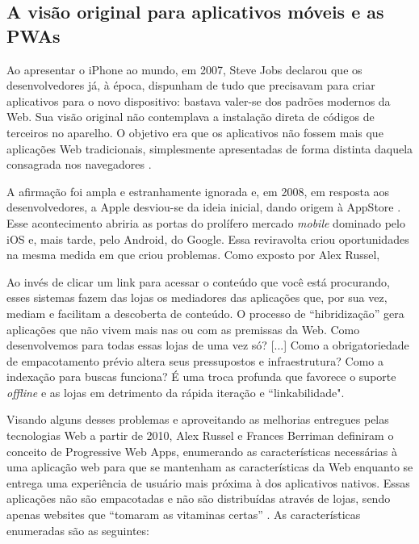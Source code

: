 \documentclass[
	article,			%
	11pt,				%
	oneside,			%
	a4paper,			%
	english,			%
	brazil,				%
	sumario=tradicional
	]{abntex2}
\begin{document}
\subsection{A visão original para aplicativos móveis e as PWAs}

Ao apresentar o iPhone ao mundo, em 2007, Steve Jobs declarou que os desenvolvedores  já, à época,  dispunham de tudo que precisavam para criar aplicativos para o novo dispositivo: bastava valer-se dos padrões modernos da Web. Sua visão original não contemplava a instalação direta de códigos de terceiros no aparelho. O objetivo era que os aplicativos não fossem mais que aplicações Web tradicionais, simplesmente apresentadas de forma distinta daquela consagrada nos navegadores \cite{9to5-2011}.

A afirmação foi ampla e estranhamente ignorada e, em 2008, em resposta aos desenvolvedores, a Apple desviou-se da ideia inicial, dando origem à AppStore \cite{9to5-2011}. Esse acontecimento abriria as portas do prolífero mercado \textit{mobile} dominado pelo iOS e, mais tarde, pelo Android, do Google. Essa reviravolta criou oportunidades na mesma medida em que criou problemas. Como exposto por Alex Russel,

\begin{citacao}
Ao invés de clicar um link para acessar o conteúdo que você está procurando, esses sistemas fazem das lojas os mediadores das aplicações que, por sua vez, mediam e facilitam a descoberta de conteúdo. O processo de “hibridização” gera aplicações que não vivem mais nas ou com as premissas da Web. Como desenvolvemos para todas essas lojas de uma vez só? [...] Como a obrigatoriedade de empacotamento prévio altera seus pressupostos e infraestrutura? Como a indexação para buscas funciona? É uma troca profunda que favorece o suporte \textit{offline} e as lojas em detrimento da rápida iteração e “linkabilidade". \cite[tradução nossa]{russel-2015}
\end{citacao}

Visando alguns desses problemas e aproveitando as melhorias entregues pelas tecnologias Web a partir de 2010, Alex Russel e Frances Berriman definiram o conceito de Progressive Web Apps, enumerando as características necessárias à uma aplicação web para que se mantenham as características da Web enquanto se entrega uma experiência de usuário mais próxima à dos aplicativos nativos. Essas aplicações não são empacotadas e não são distribuídas através de lojas, sendo apenas websites que “tomaram as vitaminas certas” \cite{russel-2015}. As características enumeradas são as seguintes:
\end{document}
